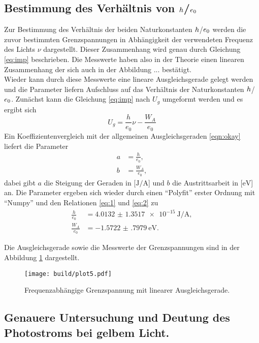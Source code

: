 \subsection{Bestimmung des Verhältnis von $\protect h$/$\protect e_{0}$}

Zur Bestimmung des Verhältnis der beiden Naturkonstanten $\protect h$/$\protect e_{0}$ werden die zuvor bestimmten Grenzspannungen in Abhängigkeit der verwendeten Frequenz des Lichts $\nu$ dargestellt.
Dieser Zusammenhang wird genau durch Gleichung \eqref{eq:imp} beschrieben. Die Messwerte haben also in der Theorie einen linearen Zusammenhang der sich auch in der Abbildung ... bestätigt.
\\
Wieder kann durch diese Messwerte eine lineare Ausgleichsgerade gelegt werden und die Parameter liefern Aufschluss auf das Verhältnis der Naturkonstanten $\protect h$/$\protect e_{0}$.
Zunächst kann die Gleichung \eqref{eq:imp} nach $U_{g}$ umgeformt werden und es ergibt sich
\begin{equation}
U_{g} = \frac{h}{e_{0}} \nu - \frac{W_A}{e_{0}}
\end{equation}
Ein Koeffizientenvergleich mit der allgemeinen Ausgleichsgeraden \eqref{eqn:okay} liefert die Parameter
\begin{align}
    \label{eq:1}
a &= \frac{h}{e_{0}},\\
    \label{eq:2}
b &= \frac{W_A}{e_{0}},
\end{align}
dabei gibt $a$ die Steigung der Geraden in [$\si{\joule\per\ampere}$] und $b$ die Austrittsarbeit in [$\si{\electronvolt}$] an.
Die Parameter ergeben sich wieder durch einen \enquote{Polyfit} erster Ordnung mit \enquote{Numpy} \cite{numpy} und den Relationen \eqref{eq:1} und \eqref{eq:2} zu
\begin{align}
\frac{h}{e_{0}} &= \SI{4.0132(13517)e-15}{\joule\per\ampere},\\
\frac{W_A}{e_{0}} &= \SI{-1.5722(7979)}{\electronvolt}.
\end{align}

Die Ausgleichsgerade sowie die Messwerte der Grenzspannungen sind in der Abbildung \ref{fig:3} dargestellt.

\begin{figure}
    \centering
    \texttt{[image: build/plot5.pdf]}
    \caption{Frequenzabhängige Grenzspannung mit linearer Ausgleichsgerade.}
    \label{fig:3}
\end{figure}

\subsection{Genauere Untersuchung und Deutung des Photostroms bei gelbem Licht.}

